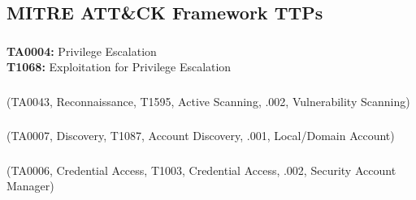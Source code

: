 \documentclass[notitlepage]{article}
\begin{document}
    \subsection{MITRE ATT{\&}CK Framework TTPs}    
	
	\subsubsection*{}
	\indent\textbf{TA0004:} Privilege Escalation \\
    \indent\indent\textbf{T1068:} Exploitation for Privilege Escalation \\ 

    \subsubsection*{}
    \ttp(TA0043, Reconnaissance, T1595, Active Scanning, .002, Vulnerability Scanning)
	
    \subsubsection*{}
	\ttp(TA0007, Discovery, T1087, Account Discovery, .001, Local/Domain Account) 

    \subsubsection*{}
    \ttp(TA0006, Credential Access, T1003, Credential Access, .002, Security Account Manager)
\end{document}

